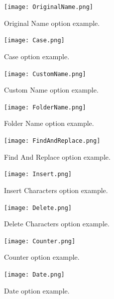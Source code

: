 \documentclass[10pt, a4paper]{scrartcl}
\begin{document}
\begin{figure}[!ht]
        \centering
        \texttt{[image: OriginalName.png]}
        \caption{Original Name option example.}
        \label{OriginalName}
\end{figure}
\begin{figure}[!ht]
        \centering
        \texttt{[image: Case.png]}
        \caption{Case option example.}
        \label{Case}
\end{figure}
\begin{figure}[!ht]
        \centering
        \texttt{[image: CustomName.png]}
        \caption{Custom Name option example.}
        \label{CustomName}
\end{figure}
\begin{figure}[!ht]
        \centering
        \texttt{[image: FolderName.png]}
        \caption{Folder Name option example.}
        \label{FolderName}
\end{figure}
\begin{figure}[!ht]
        \centering
        \texttt{[image: FindAndReplace.png]}
        \caption{Find And Replace option example.}
        \label{FindAndReplace}
\end{figure}
\begin{figure}[!ht]
        \centering
        \texttt{[image: Insert.png]}
        \caption{Insert Characters option example.}
        \label{Insert}
\end{figure}
\begin{figure}[!ht]
        \centering
        \texttt{[image: Delete.png]}
        \caption{Delete Characters option example.}
        \label{Delete}
\end{figure}
\begin{figure}[!ht]
        \centering
        \texttt{[image: Counter.png]}
        \caption{Counter option example.}
        \label{Counter}
\end{figure}
\begin{figure}[!ht]
        \centering
        \texttt{[image: Date.png]}
        \caption{Date option example.}
        \label{Date}
\end{figure}
\end{document}
